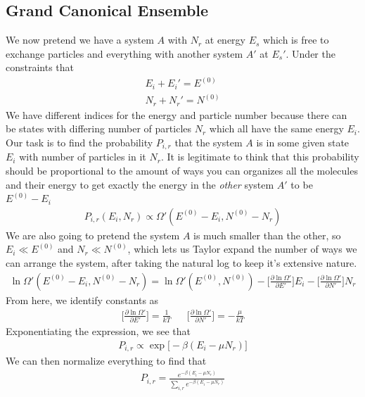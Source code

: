 
\subsection{Grand Canonical Ensemble}%
We now pretend we have a system $A$ with $N_r$ at energy $E_s$ which is free to exchange particles and everything with another system $A'$ at $E_s'$. Under the constraints that
\begin{align}
E_i + E_i' = E^{(0)}\\
N_r + N_r' = N^{(0)}
\end{align}
We have different indices for the energy and particle number because there can be states with differing number of particles $N_r$ which all have the same energy $E_i$. Our task is to find the probability $P_{i,r}$ that the system $A$ is in some given state $E_i$ with number of particles in it $N_r$. It is legitimate to think that this probability should be proportional to the amount of ways you can organizes all the molecules and their energy to get exactly the energy in the \emph{other} system $A'$ to be $E^{(0)} - E_i$
\begin{align}
P_{i,r}(E_i,N_r) \propto \Omega'(E^{(0)} - E_i , N^{(0)}- N_r)
\end{align}
We are also going to pretend the system $A$ is much smaller than the other, so $E_i\ll E^{(0)}$ and $N_r \ll N^{(0)}$, which lets us Taylor expand the number of ways we can arrange the system, after taking the natural log to keep it's extensive nature.
\begin{align}
\ln\Omega'(E^{(0)} - E_i , N^{(0)}- N_r) = \ln\Omega'(E^{(0)},N^{(0)}) - \Big[\frac{\partial\ln\Omega'}{\partial E'}\Big] E_i - \Big[\frac{\partial\ln\Omega'}{\partial N'}\Big]N_r
\end{align}
From here, we identify constants as 
\begin{align}
\Big[\frac{\partial\ln\Omega'}{\partial E'}\Big] = \frac{1}{kT}&&\Big[\frac{\partial\ln\Omega'}{\partial N'}\Big] = -\frac{\mu}{kT}
\end{align}
Exponentiating the expression, we see that 
\begin{align}
P_{i,r}\propto\exp\Big[-\beta(E_i-\mu N_r)\Big]
\end{align}
We can then normalize everything to find that
\begin{align}
P_{i,r} = \frac{e^{-\beta(E_i-\mu N_r)}}{\sum_{i,r}e^{-\beta(E_i-\mu N_r)}}
\end{align}




